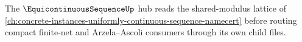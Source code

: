 The $\EquicontinuousSequenceUp$ hub reads the shared-modulus lattice of \autoref{ch:concrete-instances-uniformly-continuous-sequence-namecert} before routing compact finite-net and Arzela--Ascoli consumers through its own child files.




